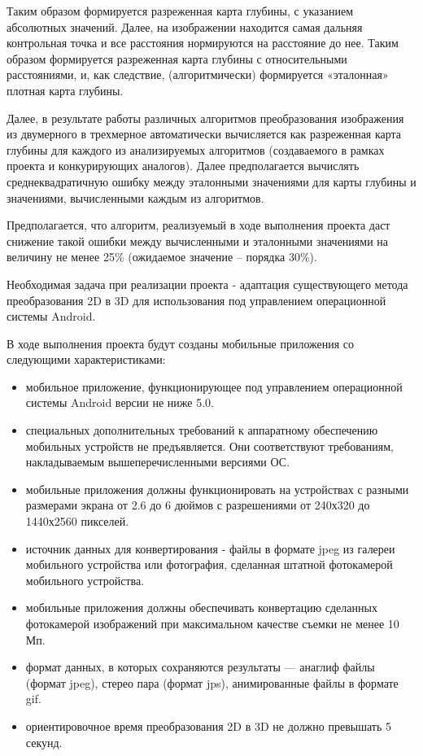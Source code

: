 Таким образом формируется разреженная карта глубины, с указанием абсолютных значений. Далее, на изображении находится самая дальняя контрольная точка и все расстояния нормируются на расстояние до нее. Таким образом формируется разреженная карта глубины с относительными расстояниями, и, как следствие, (алгоритмически) формируется «эталонная» плотная карта глубины.

Далее, в результате работы различных алгоритмов преобразования изображения из двумерного в трехмерное автоматически вычисляется как разреженная карта глубины для каждого из анализируемых алгоритмов (создаваемого в рамках проекта и конкурирующих аналогов). Далее предполагается вычислять среднеквадратичную ошибку между эталонными значениями для карты глубины и значениями, вычисленными каждым из алгоритмов.

Предполагается, что алгоритм, реализуемый в ходе выполнения проекта даст снижение такой ошибки между вычисленными и эталонными значениями на величину не менее 25\% (ожидаемое значение – порядка 30\%).

Необходимая задача при реализации проекта - адаптация существующего метода преобразования 2D в 3D для использования под управлением операционной системы Android.

В ходе выполнения проекта будут созданы мобильные приложения со следующими характеристиками:

\begin{itemize}
	\item мобильное приложение, функционирующее под управлением операционной системы Android версии не ниже 5.0.
	\item специальных дополнительных требований к аппаратному обеспечению мобильных устройств не предъявляется. Они соответствуют требованиям, накладываемым вышеперечисленными версиями ОС.
	\item мобильные приложения должны функционировать на устройствах с разными размерами экрана от 2.6 до 6 дюймов с разрешениями от 240х320 до 1440х2560 пикселей.
	\item источник данных для конвертирования - файлы в формате jpeg из галереи мобильного устройства или фотография, сделанная штатной фотокамерой мобильного устройства.
	\item мобильные приложения должны обеспечивать конвертацию сделанных фотокамерой изображений при максимальном качестве съемки не менее 10 Мп.
	\item формат данных, в которых сохраняются результаты --- анаглиф файлы (формат jpeg), стерео пара (формат jps), анимированные файлы в формате gif.
	\item ориентировочное время преобразования 2D в 3D не должно превышать 5 секунд.
\end{itemize}


